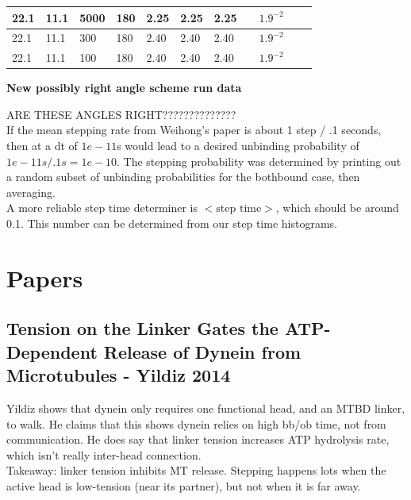 \documentclass[10pt]{article} %
\begin{document}
\begin{center}
\begin{tabular}{| l | l | l | l | l | l | l | p{3cm} | p{2cm} | l | p{5cm} |}
    22.1 & 11.1 & 5000 &  180 & 2.25 & 2.25 & 2.25 & & $1.9^{-2}$ & & \\\hline
    22.1 & 11.1 & 300 &  180 & 2.40 & 2.40 & 2.40 & & $1.9^{-2}$ & & \\\hline
    22.1 & 11.1 & 100 &  180 & 2.40 & 2.40 & 2.40 & & $1.9^{-2}$ & & \\\hline
  \end{tabular}
  \textbf{New possibly right angle scheme run data}
\end{center}

ARE THESE ANGLES RIGHT??????????????\\

If the mean stepping rate from Weihong's paper is about 1 step / .1 seconds, then at a dt of $1e-11$s would lead to a desired unbinding
probability of $1e-11s/.1s = 1e-10$. The stepping probability was determined by printing out a random subset of unbinding probabilities
for the bothbound case, then averaging.\\

A more reliable step time determiner is $\Big<\mbox{step time}\Big>$, which should be around 0.1. This number can be determined from our step time histograms.\\

\section{Papers}
\subsection{Tension on the Linker Gates the ATP-Dependent Release of Dynein from Microtubules - Yildiz 2014}
Yildiz shows that dynein only requires one functional head, and an MTBD linker, to walk. He claims that this shows dynein relies on high bb/ob time, not from communication. He does say that linker tension increases ATP hydrolysis rate, which isn't really inter-head connection.\\
Takeaway: linker tension inhibits MT release. Stepping happens lots when the active head is low-tension (near its partner), but not when it is far away.\\
\end{document}
